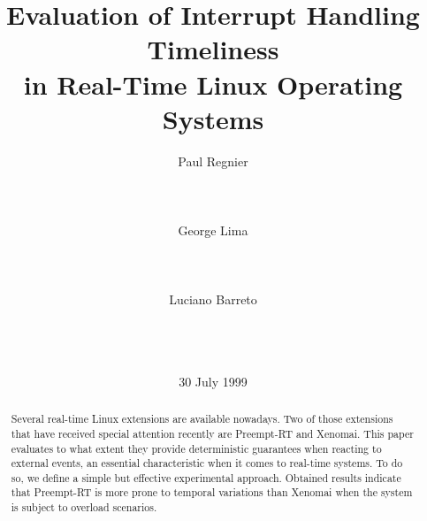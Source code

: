 \documentclass{acm_proc_article-sp}
\begin{document}


     
 
\title{Evaluation of Interrupt Handling Timeliness\\in Real-Time Linux Operating Systems}

\author{
\alignauthor
Paul Regnier\\%
       \\
       \\
       \\
%
\alignauthor
George Lima \\%
       \\
       \\
       \\
%
\alignauthor
Luciano Barreto \\%
       \\
       \\
       \\
}

\date{30 July 1999}


\maketitle

\begin{abstract}
  Several real-time Linux extensions are available nowadays. Two of those extensions
  that have received special attention recently are Preempt-RT and Xenomai. This
  paper evaluates to what extent they provide deterministic guarantees when reacting
  to external events, an essential characteristic when it comes to real-time
  systems. To do so, we define a simple but effective experimental approach.
  Obtained results indicate that Preempt-RT is more prone to temporal variations
  than Xenomai when the system is subject to overload scenarios.
\end{abstract}
      
\end{document}
